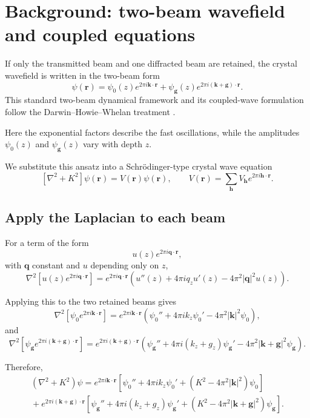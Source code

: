 \documentclass[11pt]{article}
\begin{document}
\section{Background: two-beam wavefield and coupled equations}

If only the transmitted beam and one diffracted beam are retained, the crystal wavefield is written in the two-beam form
\[
\psi(\mathbf r)=\psi_0(z)e^{2\pi i \mathbf k\cdot \mathbf r}
+
\psi_{\mathbf g}(z)e^{2\pi i (\mathbf k+\mathbf g)\cdot \mathbf r}.
\]
This standard two-beam dynamical framework and its coupled-wave formulation follow the Darwin--Howie--Whelan treatment \cite{MoodieCowleyGoodman_DynamicalED}.

Here the exponential factors describe the fast oscillations, while the amplitudes \(\psi_0(z)\) and \(\psi_{\mathbf g}(z)\) vary with depth \(z\).

We substitute this ansatz into a Schr\"odinger-type crystal wave equation
\[
\left[\nabla^2+K^2\right]\psi(\mathbf r)=V(\mathbf r)\psi(\mathbf r),
\qquad
V(\mathbf r)=\sum_{\mathbf h} V_{\mathbf h} e^{2\pi i \mathbf h\cdot \mathbf r}.
\]

\subsection*{Apply the Laplacian to each beam}

For a term of the form
\[
u(z)e^{2\pi i \mathbf q\cdot \mathbf r},
\]
with \(\mathbf q\) constant and \(u\) depending only on \(z\),
\[
\nabla^2\!\left[u(z)e^{2\pi i \mathbf q\cdot \mathbf r}\right]
=
e^{2\pi i \mathbf q\cdot \mathbf r}
\left(
u''(z)+4\pi i q_z u'(z)-4\pi^2 |\mathbf q|^2 u(z)
\right).
\]

Applying this to the two retained beams gives
\[
\nabla^2\!\left[\psi_0 e^{2\pi i \mathbf k\cdot \mathbf r}\right]
=
e^{2\pi i \mathbf k\cdot \mathbf r}
\left(
\psi_0''+4\pi i k_z \psi_0'-4\pi^2 |\mathbf k|^2 \psi_0
\right),
\]
and
\[
\nabla^2\!\left[\psi_{\mathbf g} e^{2\pi i (\mathbf k+\mathbf g)\cdot \mathbf r}\right]
=
e^{2\pi i (\mathbf k+\mathbf g)\cdot \mathbf r}
\left(
\psi_{\mathbf g}''+4\pi i (k_z+g_z) \psi_{\mathbf g}'-4\pi^2 |\mathbf k+\mathbf g|^2 \psi_{\mathbf g}
\right).
\]

Therefore,
\begin{multline}
(\nabla^2+K^2)\psi
=
e^{2\pi i \mathbf k\cdot \mathbf r}
\left[
\psi_0''+4\pi i k_z \psi_0'+(K^2-4\pi^2|\mathbf k|^2)\psi_0
\right]
\\
{}+
e^{2\pi i (\mathbf k+\mathbf g)\cdot \mathbf r}
\left[
\psi_{\mathbf g}''+4\pi i (k_z+g_z)\psi_{\mathbf g}'
+(K^2-4\pi^2|\mathbf k+\mathbf g|^2)\psi_{\mathbf g}
\right].
\end{multline}
\end{document}
